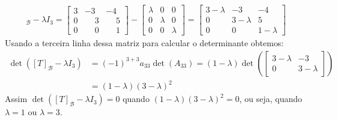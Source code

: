 \begin{exemplo}
\begin{enumerate}[label={\arabic*})]
\begin{solucao}
            \begin{align*}
                [T]_\mathcal{B} - \lambda I_3 = \begin{bmatrix}3 & -3 & -4\\0 & \phantom{-}3 & \phantom{-}5\\0 & \phantom{-}0 & \phantom{-}1\end{bmatrix} - \begin{bmatrix} \lambda & 0 & 0\\0 & \lambda & 0\\0 & 0 & \lambda\end{bmatrix} = \begin{bmatrix}3 - \lambda & -3 & -4\\0 & 3 - \lambda & 5\\0 & 0 &1 - \lambda\end{bmatrix}
            \end{align*}
            Usando a terceira linha dessa matriz para calcular o determinante obtemos:
            \begin{align*}
                \det([T]_\mathcal{B} - \lambda I_3) &= (-1)^{3 + 3}a_{33}\det(A_{33}) = (1 - \lambda)\det\left(\begin{bmatrix}3 - \lambda & -3\\0 & 3 - \lambda\end{bmatrix}\right) \\ &= (1 - \lambda)(3 - \lambda)^2
            \end{align*}
            Assim $\det([T]_\mathcal{B} - \lambda I_3) = 0$ quando $(1 - \lambda)(3 - \lambda)^2 = 0$, ou seja, quando $\lambda = 1$ ou $\lambda = 3$.


\end{solucao}
\end{enumerate}
\end{exemplo}
